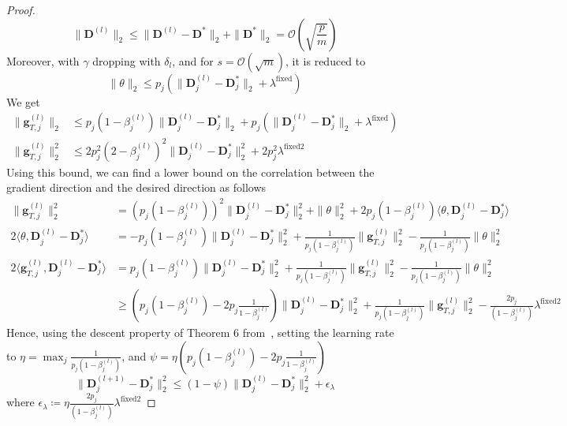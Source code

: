 \documentclass[10pt]{article} %
\newcommand{\D}{{\bm D}}
\newcommand{\g}{{\bm g}}
\begin{document}
\begin{proof}
\begin{equation}
  \| \D^{(l)} \|_2 \leq \| \D^{(l)} - \D^{\ast} \|_2 + \| \D^{\ast} \|_2 = \mathcal{O}(\sqrt{\frac{p}{m}})
\end{equation}
Moreover, with $\gamma$ dropping with $\delta_l$, and for $s =\mathcal{O}(\sqrt{m})$, it is reduced to
\begin{equation}
  \| \theta \|_2 \leq p_j (\| \D_j^{(l)} - \D_j^{\ast} \|_2 + \lambda^{\text{fixed}})
\end{equation}
We get
\begin{equation}
\begin{aligned}
  \| \g_{T, j}^{(l)} \|_2 &\leq p_j (1 - \beta_j^{(l)}) \| \D_j^{(l)}
    - \D_j^{\ast} \|_2 + p_j (\| \D_j^{(l)}
    - \D_j^{\ast} \|_2 + \lambda^{\text{fixed}})\\
  \| \g_{T, j}^{(l)} \|_2^2 &\leq 2p_j^2 (2 - \beta_j^{(l)})^2 \| \D_j^{(l)}
    - \D_j^{\ast} \|_2^2 + 2p_j^2 \lambda^{\text{fixed}2}
\end{aligned}
\end{equation}
Using this bound, we can find a lower bound on the correlation between the gradient direction and the desired direction as follows
\begin{equation}
\begin{aligned}
  \| \g_{T, j}^{(l)} \|_2^2 &= (p_j (1 - \beta_j^{(l)}))^2 \| \D_j^{(l)}
    - \D_j^{\ast} \|_2^2 + \|\theta\|_2^2 + 2 p_j (1 - \beta_j^{(l)}) \langle \theta, \D_j^{(l)}
    - \D_j^{\ast} \rangle\\
2 \langle \theta, \D_j^{(l)}
    - \D_j^{\ast} \rangle &= - p_j (1 - \beta_j^{(l)}) \| \D_j^{(l)} 
    - \D_j^{\ast} \|_2^2 + \frac{1}{p_j (1 - \beta_j^{(l)})} \| \g_{T, j}^{(l)} \|_2^2 - \frac{1}{p_j (1 - \beta_j^{(l)})} \|\theta\|_2^2\\
2 \langle \g_{T, j}^{(l)}, \D_j^{(l)}
    - \D_j^{\ast} \rangle &= p_j (1 - \beta_j^{(l)}) \| \D_j^{(l)} 
    - \D_j^{\ast} \|_2^2 + \frac{1}{p_j (1 - \beta_j^{(l)})} \| \g_{T, j}^{(l)} \|_2^2 - \frac{1}{p_j (1 - \beta_j^{(l)})} \|\theta\|_2^2\\
& \geq (p_j (1 - \beta_j^{(l)}) - 2 p_j \frac{1}{1 - \beta_j^{(l)}}) \| \D_j^{(l)} 
    - \D_j^{\ast} \|_2^2 + \frac{1}{p_j (1 - \beta_j^{(l)})} \| \g_{T, j}^{(l)} \|_2^2 - \frac{2p_j}{(1 - \beta_j^{(l)})} \lambda^{\text{fixed}2}
\end{aligned}
\end{equation}
Hence, using the descent property of Theorem 6 from~\citep{arora2015sparsecoding}, setting the learning rate to $\eta = \max_j \frac{1}{p_j (1 - \beta_j^{(l)})}$, and $\psi = \eta (p_j (1 - \beta_j^{(l)}) - 2p_j \frac{1}{1 - \beta_j^{(l)}})$
\begin{equation}
    \| \D_j^{(l+1)} - \D_j^{\ast} \|_2^2 \leq (1 - \psi)   \| \D_j^{(l)} - \D_j^{\ast} \|_2^2 + \epsilon_{\lambda}
\end{equation}
where $\epsilon_{\lambda} \coloneqq \eta \frac{2p_j}{(1 - \beta_j^{(l)})} \lambda^{\text{fixed}2}$
\end{proof}
\end{document}
